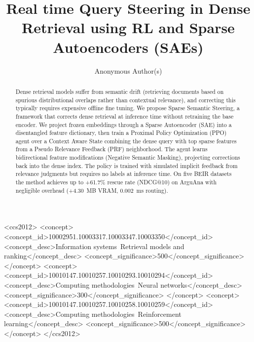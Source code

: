 \documentclass[sigconf]{acmart}
\begin{document}
\title{Real time Query Steering in Dense Retrieval using RL and Sparse Autoencoders (SAEs)}

\author{Anonymous Author(s)}

\renewcommand{\shortauthors}{Anonymous}

\begin{abstract}
Dense retrieval models suffer from semantic drift (retrieving documents based on spurious distributional overlaps rather than contextual relevance), and correcting this typically requires expensive offline fine tuning. We propose Sparse Semantic Steering, a framework that corrects dense retrieval at inference time without retraining the base encoder. We project frozen embeddings through a Sparse Autoencoder (SAE) into a disentangled feature dictionary, then train a Proximal Policy Optimization (PPO) agent over a Context Aware State combining the dense query with top sparse features from a Pseudo Relevance Feedback (PRF) neighborhood. The agent learns bidirectional feature modifications (Negative Semantic Masking), projecting corrections back into the dense index. The policy is trained with simulated implicit feedback from relevance judgments but requires no labels at inference time. On five BEIR datasets the method achieves up to +61.7\% rescue rate (NDCG@10) on ArguAna with negligible overhead (+4.30~MB VRAM, 0.002~ms routing).
\end{abstract}

\begin{CCSXML}
<ccs2012>
 <concept>
  <concept_id>10002951.10003317.10003347.10003350</concept_id>
  <concept_desc>Information systems~Retrieval models and ranking</concept_desc>
  <concept_significance>500</concept_significance>
 </concept>
 <concept>
  <concept_id>10010147.10010257.10010293.10010294</concept_id>
  <concept_desc>Computing methodologies~Neural networks</concept_desc>
  <concept_significance>300</concept_significance>
 </concept>
 <concept>
  <concept_id>10010147.10010257.10010258.10010259</concept_id>
  <concept_desc>Computing methodologies~Reinforcement learning</concept_desc>
  <concept_significance>500</concept_significance>
 </concept>
</ccs2012>
\end{CCSXML}


\end{document}
